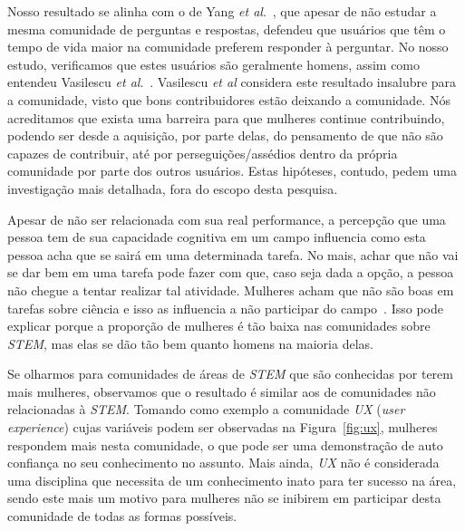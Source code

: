 Nosso resultado se alinha com o de Yang \textit{et al}.~\cite{yang2010activity}, que apesar de não estudar a mesma comunidade de perguntas e respostas, defendeu que usuários que têm o tempo de vida maior na comunidade preferem responder à perguntar. No nosso estudo, verificamos que estes usuários são geralmente homens, assim como entendeu Vasilescu \textit{et al}.~\cite{Vasilescu27092013}. Vasilescu \textit{et al} considera este resultado insalubre para a comunidade, visto que bons contribuidores estão deixando a comunidade. Nós acreditamos que exista uma barreira para que mulheres continue contribuindo, podendo ser desde a aquisição, por parte delas, do pensamento de que não são capazes de contribuir, até por perseguições/assédios dentro da própria comunidade por parte dos outros usuários. Estas hipóteses, contudo, pedem uma investigação mais detalhada, fora do escopo desta pesquisa.

Apesar de não ser relacionada com sua real performance, a percepção que uma pessoa tem de sua capacidade cognitiva em um campo influencia como esta pessoa acha que se sairá em uma determinada tarefa. No mais, achar que não vai se dar bem em uma tarefa pode fazer com que, caso seja dada a opção, a pessoa não chegue a tentar realizar tal atividade. Mulheres acham que não são boas em tarefas sobre ciência e isso as influencia a não participar do campo~\cite{ehrlinger2003chronic}. Isso pode explicar porque a proporção de mulheres é tão baixa nas comunidades sobre \emph{STEM}, mas elas se dão tão bem quanto homens na maioria delas.


Se olharmos para comunidades de áreas de \emph{STEM} que são conhecidas por terem mais mulheres, observamos que o resultado é similar aos de comunidades não relacionadas à \emph{STEM}. Tomando como exemplo a comunidade \emph{UX} (\textit{user experience}) cujas variáveis podem ser observadas na Figura~\ref{fig:ux}, mulheres respondem mais nesta comunidade, o que pode ser uma demonstração de auto confiança no seu conhecimento no assunto. Mais ainda, \emph{UX} não é considerada uma disciplina que necessita de um conhecimento inato para ter sucesso na área, sendo este mais um motivo para mulheres não se inibirem em participar desta comunidade de todas as formas possíveis. 


